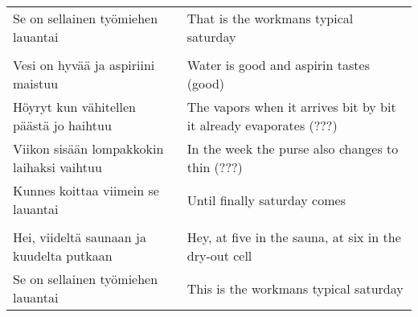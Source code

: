 \documentclass[12pt,a4paper]{article}
\begin{document}
\begin{tabular}{ll}
Se on sellainen työmiehen lauantai & That is the workmans typical saturday \\
\\
Vesi on hyvää ja aspiriini maistuu & Water is good and aspirin tastes (good) \\
Höyryt kun vähitellen päästä jo haihtuu & The vapors when it arrives bit by bit it already evaporates (???) \\
Viikon sisään lompakkokin laihaksi vaihtuu & In the week the purse also changes to thin (???) \\
Kunnes koittaa viimein se lauantai & Until finally saturday comes \\
\\
Hei, viideltä saunaan ja kuudelta putkaan & Hey, at five in the sauna, at six in the dry-out cell \\
Se on sellainen työmiehen lauantai & This is the workmans typical saturday
\end{tabular}
\end{document}
